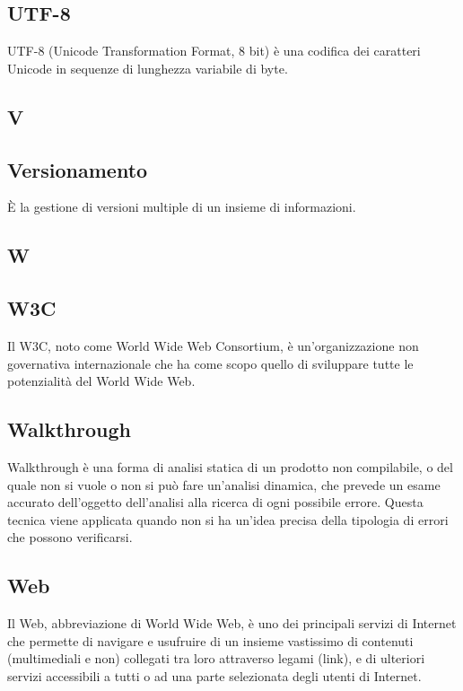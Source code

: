 \subsection{UTF-8}
UTF-8 (Unicode Transformation Format, 8 bit) è una codifica dei caratteri Unicode in sequenze di lunghezza variabile di byte.

\newpage

\begin{center}
\Huge\section{\uppercase{V}}
\end{center}

\subsection{Versionamento}
È la gestione di versioni multiple di un insieme di informazioni.

\newpage

\begin{center}
\Huge\section{\uppercase{W}}
\end{center}

\subsection{W3C}
Il W3C, noto come World Wide Web Consortium, è un'organizzazione non governativa internazionale che ha come scopo quello di sviluppare tutte le potenzialità del World Wide Web.

\subsection{Walkthrough }
Walkthrough è una forma di analisi statica di un prodotto non compilabile, o del
quale non si vuole o non si può fare un'analisi dinamica, che prevede un esame accurato
dell'oggetto dell'analisi alla ricerca di ogni possibile errore. Questa tecnica viene applicata
quando non si ha un'idea precisa della tipologia di errori che possono verificarsi.

\subsection{Web}
Il Web, abbreviazione di World Wide Web, è uno dei principali servizi di Internet che permette di navigare e usufruire di un insieme vastissimo di contenuti (multimediali e non) collegati tra loro attraverso legami (link), e di ulteriori servizi accessibili a tutti o ad una parte selezionata degli utenti di Internet.

